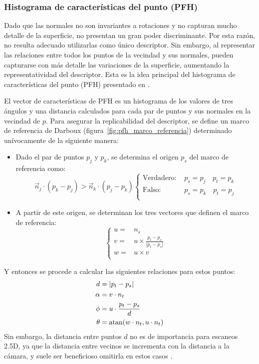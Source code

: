 \subsubsection{Histograma de características del punto (PFH)}
Dado que las normales no son invariantes a rotaciones y no capturan mucho
detalle de la superficie, no presentan un gran poder discriminante.
Por esta razón, no resulta adecuado utilizarlas como único descriptor.
Sin embargo, al representar las relaciones entre todos los puntos de la vecindad y sus normales,
pueden capturarse con más detalle las variaciones de la superficie,
aumentando la representatividad del descriptor.
Esta es la idea principal del histograma de características del punto (PFH) presentado en \cite{RusuDoctoralDissertation}.

El vector de características de PFH es un histograma de los valores de tres ángulos
y una distancia calculados para cada par de puntos y sus normales en la vecindad de $p$.
Para asegurar la replicabilidad del descriptor, se define un marco de referencia de Darboux
(figura~\ref{fig:pfh_marco_referencia})
determinado unívocamente de la siguiente manera:
\begin{itemize}
	\item Dado el par de puntos $p_j$ y $p_k$, se determina el origen $p_s$ del marco de referencia como:
		\[
			\vec{n}_j \cdot (p_k - p_j) > \vec{n}_k \cdot (p_j - p_k)
			\begin{cases}
				\text{Verdadero: }& p_s = p_j \quad p_t = p_k\\
				\text{Falso: }& p_s = p_k \quad p_t = p_j\\
			\end{cases}
		\]
	\item A partir de este origen, se determinan los tres vectores que definen el marco de referencia:
\[
	\begin{cases}
		u =& n_s \\
		v =& u \times \displaystyle\frac{p_t - p_s}{|p_t - p_s|} \\
		w =& u \times v \\
	\end{cases}
\]
\end{itemize}
Y entonces se procede a calcular las siguientes relaciones para estos puntos:
	\begin{align*}
		d        &= |p_t - p_s| \\
		\alpha   &= v \cdot n_t \\
		\phi     &= u \cdot \frac{p_t - p_s}{d}\\
		\theta   &= \operatorname{atan}(w \cdot n_t, u \cdot n_t)
	\end{align*}
Sin embargo, la distancia entre puntos $d$ no es de importancia para escaneos 2.5D,
ya que la distancia entre vecinos se incrementa con la distancia a la cámara,
y suele ser beneficioso omitirla en estos casos \cite{RusuDoctoralDissertation}.

